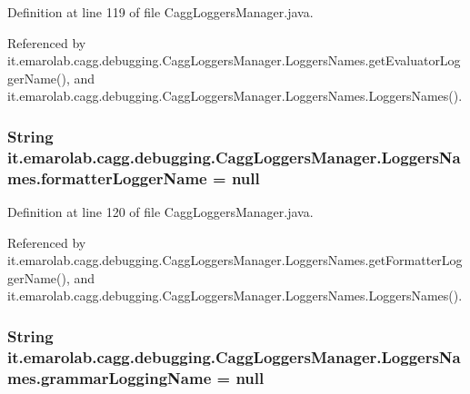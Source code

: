 Definition at line 119 of file Cagg\-Loggers\-Manager.\-java.



Referenced by it.\-emarolab.\-cagg.\-debugging.\-Cagg\-Loggers\-Manager.\-Loggers\-Names.\-get\-Evaluator\-Logger\-Name(), and it.\-emarolab.\-cagg.\-debugging.\-Cagg\-Loggers\-Manager.\-Loggers\-Names.\-Loggers\-Names().

\hypertarget{classit_1_1emarolab_1_1cagg_1_1debugging_1_1CaggLoggersManager_1_1LoggersNames_a3512e367d55c5c6fc6f1f2fabae2a7c0}{
\subsubsection[{formatter\-Logger\-Name}]{\setlength{\rightskip}{0pt plus 5cm}String it.\-emarolab.\-cagg.\-debugging.\-Cagg\-Loggers\-Manager.\-Loggers\-Names.\-formatter\-Logger\-Name = null\hspace{0.3cm}{\ttfamily [private]}}}\label{classit_1_1emarolab_1_1cagg_1_1debugging_1_1CaggLoggersManager_1_1LoggersNames_a3512e367d55c5c6fc6f1f2fabae2a7c0}


Definition at line 120 of file Cagg\-Loggers\-Manager.\-java.



Referenced by it.\-emarolab.\-cagg.\-debugging.\-Cagg\-Loggers\-Manager.\-Loggers\-Names.\-get\-Formatter\-Logger\-Name(), and it.\-emarolab.\-cagg.\-debugging.\-Cagg\-Loggers\-Manager.\-Loggers\-Names.\-Loggers\-Names().

\hypertarget{classit_1_1emarolab_1_1cagg_1_1debugging_1_1CaggLoggersManager_1_1LoggersNames_a789725ee9f7c0046f86227f0ddff92b3}{
\subsubsection[{grammar\-Logging\-Name}]{\setlength{\rightskip}{0pt plus 5cm}String it.\-emarolab.\-cagg.\-debugging.\-Cagg\-Loggers\-Manager.\-Loggers\-Names.\-grammar\-Logging\-Name = null\hspace{0.3cm}{\ttfamily [private]}}}\label{classit_1_1emarolab_1_1cagg_1_1debugging_1_1CaggLoggersManager_1_1LoggersNames_a789725ee9f7c0046f86227f0ddff92b3}


